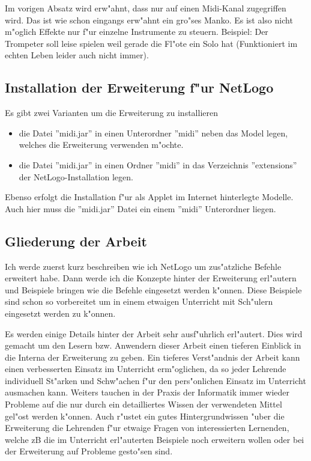Im vorigen Absatz wird erw"ahnt, dass nur auf einen Midi-Kanal zugegriffen wird.
Das ist wie schon eingangs erw"ahnt ein gro"ses Manko. Es ist also nicht
m"oglich Effekte nur f"ur einzelne Instrumente zu steuern. Beispiel: Der 
Trompeter soll leise spielen weil gerade die Fl"ote ein Solo hat (Funktioniert
im echten Leben leider auch nicht immer). 

\subsection{Installation der Erweiterung f"ur NetLogo}
Es gibt zwei Varianten um die Erweiterung zu installieren
\begin{itemize}
\item die Datei ''midi.jar'' in einen Unterordner ''midi'' neben das Model legen,
welches die Erweiterung verwenden m"ochte.
\item die Datei ''midi.jar'' in einen Ordner ''midi'' in das Verzeichnis ''extensions''
der NetLogo-Installation legen. 
\end{itemize}
Ebenso erfolgt die Installation f"ur als Applet im Internet hinterlegte Modelle.
Auch hier muss die ''midi.jar'' Datei ein einem ''midi'' Unterordner liegen.

\subsection{Gliederung der Arbeit}
Ich werde zuerst kurz beschreiben wie ich NetLogo um zus"atzliche Befehle erweitert
habe. Dann werde ich die Konzepte hinter der Erweiterung erl"autern und
Beispiele bringen wie die Befehle eingesetzt werden k"onnen. Diese Beispiele
sind schon so vorbereitet um in einem etwaigen Unterricht mit Sch"ulern eingesetzt
werden zu k"onnen. %

Es werden einige Details hinter der Arbeit sehr ausf"uhrlich erl"autert. Dies 
wird gemacht um den Lesern bzw. Anwendern dieser Arbeit einen tieferen Einblick
in die Interna der Erweiterung zu geben. Ein tieferes Verst"andnis der Arbeit kann
einen verbesserten Einsatz im Unterricht erm"oglichen, da so jeder Lehrende 
individuell St"arken und Schw"achen f"ur den pers"onlichen Einsatz im Unterricht
ausmachen kann. Weiters tauchen in der Praxis der Informatik immer wieder Probleme
auf die nur durch ein detailliertes Wissen der verwendeten Mittel gel"ost werden
k"onnen. Auch r"ustet ein gutes Hintergrundwissen "uber die Erweiterung die
Lehrenden f"ur etwaige Fragen von interessierten Lernenden, welche zB die im
Unterricht erl"auterten Beispiele noch erweitern wollen oder bei der Erweiterung
auf Probleme gesto"sen sind. 

